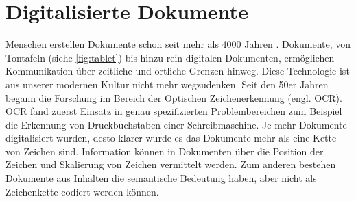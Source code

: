 \chapter{Digitalisierte Dokumente}
\label{chap:documents}


% 
Menschen erstellen Dokumente schon seit mehr als 4000 Jahren \parencite[13]{SmithDocumentCreationImage2014}. Dokumente, von Tontafeln (siehe \cref{fig:tablet})
bis hinzu rein digitalen Dokumenten, ermöglichen Kommunikation über zeitliche und ortliche Grenzen hinweg. 
Diese Technologie ist aus unserer modernen Kultur nicht mehr wegzudenken.  
Seit den 50er Jahren begann die Forschung im Bereich der Optischen Zeichenerkennung 
(engl. OCR)\autocite{DoermannHandbookdocumentimage2014}. OCR fand zuerst Einsatz in genau 
spezifizierten Problembereichen zum Beispiel die Erkennung von Druckbuchstaben einer Schreibmaschine. 
Je mehr Dokumente digitalisiert wurden, desto klarer wurde es das Dokumente mehr als 
eine Kette von Zeichen sind. 
Information können in Dokumenten über die Position der Zeichen und Skalierung von Zeichen vermittelt werden.
Zum anderen bestehen Dokumente aus Inhalten die semantische Bedeutung haben, aber nicht als Zeichenkette codiert werden können. 
